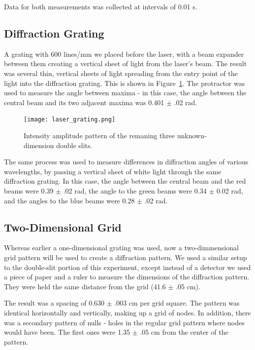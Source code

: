 \documentclass[journal]{IEEEtran}
\begin{document}
Data for both measurements was collected at intervals of 0.01 s.

\subsection{Diffraction Grating}

A grating with 600 lines/mm we placed before the laser, with a beam expander
between them creating a vertical sheet of light from the laser's beam. The
result was several thin, vertical sheets of light spreading from the entry
point of the light into the diffraction grating. This is shown in
Figure~\ref{laser_grating}. The protractor was used to measure the angle
between maxima - in this case, the angle between the central beam and its two
adjacent maxima was 0.401 $\pm$ .02 rad. 

\begin{figure}[ht!]
\centering
\texttt{[image: laser\_grating.png]}
\caption{Intensity amplitude pattern of the remaning three unknown-dimension
double slits.}
\label{laser_grating}
\end{figure}

The same process was used to measure differences in diffraction angles of
various wavelengths, by passing a vertical sheet of white light through the
same diffraction grating. In this case, the angle between the central beam and
the red beams were 0.39 $\pm$ .02 rad, the angle to the green beams were 0.34
$\pm$ 0.02 rad, and the angles to the blue beams were 0.28 $\pm$ .02 rad.

\subsection{Two-Dimensional Grid}

Whereas earlier a one-dimensional grating was used, now a two-dimmensional grid
pattern will be used to create a diffraction pattern. We used a similar setup
to the double-slit portion of this experiment, except instead of a detector we
used a piece of paper and a ruler to measure the dimensions of the diffraction
pattern. They were held the same distance from the grid (41.6 $\pm$ .05 cm).

The result was a spacing of 0.630 $\pm$ .003 cm per grid square. The pattern
was identical horizontally and vertically, making up a grid of nodes. In
addition, there was a secondary pattern of nulls - holes in the regular grid
pattern where nodes would have been. The first ones were 1.35 $\pm$ .05 cm from
the center of the pattern.
\end{document}
